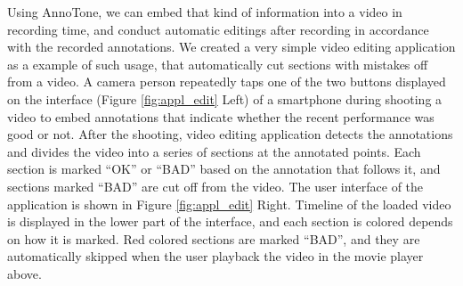 Using AnnoTone, we can embed that kind of information into a video in recording time, and conduct automatic editings after recording in accordance with the recorded annotations.
We created a very simple video editing application as a example of such usage, that automatically cut sections with mistakes off from a video.
A camera person repeatedly taps one of the two buttons displayed on the interface (Figure \ref{fig:appl_edit} Left) of a smartphone during shooting a video to embed annotations that indicate whether the recent performance was good or not.
After the shooting, video editing application detects the annotations and divides the video into a series of sections at the annotated points.
Each section is marked ``OK'' or ``BAD'' based on the annotation that follows it, and sections marked ``BAD'' are cut off from the video.
The user interface of the application is shown in Figure \ref{fig:appl_edit} Right.
Timeline of the loaded video is displayed in the lower part of the interface, and each section is colored depends on how it is marked.
Red colored sections are marked ``BAD'', and they are automatically skipped when the user playback the video in the movie player above.
